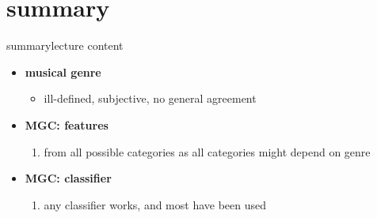     \section{summary}
        \begin{frame}{summary}{lecture content}
            \begin{itemize}
                \item   \textbf{musical genre}
                    \begin{itemize}
                        \item   ill-defined, subjective, no general agreement
                    \end{itemize}
                \bigskip
                \item   \textbf{MGC: features}
                    \begin{enumerate}
                        \item   from all possible categories as all categories might depend on genre
                    \end{enumerate}
                \bigskip
                \item   \textbf{MGC: classifier}
                    \begin{enumerate}
                        \item   any classifier works, and most have been used
                    \end{enumerate}
            \end{itemize}
        \end{frame}

